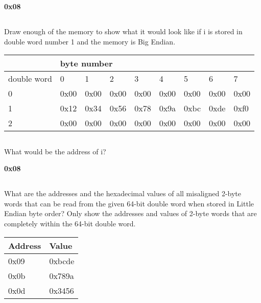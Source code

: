 \documentclass{article}
\begin{document}
\textbf{0x08}
\vspace{5mm}

\subsection{}
Draw enough of the memory to show what it would look like if i is stored in double word number 1 and the memory is Big Endian.
\vspace{5mm}

\begin{tabular}{l|l|l|l|l|l|l|l|l|}
\cline{2-9}
 & \multicolumn{8}{|l|}{byte number} \\ \hline
\multicolumn{1}{|l|}{double word} & 0 & 1 & 2 & 3 & 4 & 5 & 6 & 7 \\ \hline
\multicolumn{1}{|l|}{0} & 0x00 & 0x00 & 0x00 & 0x00 & 0x00 & 0x00 & 0x00 & 0x00 \\ \hline
\multicolumn{1}{|l|}{1} & 0x12 & 0x34 & 0x56 & 0x78 & 0x9a & 0xbc & 0xde & 0xf0 \\ \hline
\multicolumn{1}{|l|}{2} & 0x00 & 0x00 & 0x00 & 0x00 & 0x00 & 0x00 & 0x00 & 0x00 \\ \hline
\end{tabular}
\vspace{5mm}

\subsection{}
What would be the address of i? 
\vspace{5mm}

\textbf{0x08}
\vspace{5mm}

\subsection{}
What are the addresses and the hexadecimal values of all misaligned 2-byte words that can be read from the given 64-bit double word when stored in Little Endian byte order? Only show the addresses and values of 2-byte words that are completely within the 64-bit double word.
\vspace{5mm}

\begin{tabular}{|l|l|}
\hline
Address & Value \\ 
\hline
0x09 & 0xbcde \\ \hline
0x0b & 0x789a \\ \hline
0x0d & 0x3456 \\ \hline
\end{tabular}
\vspace{5mm}
\end{document}
